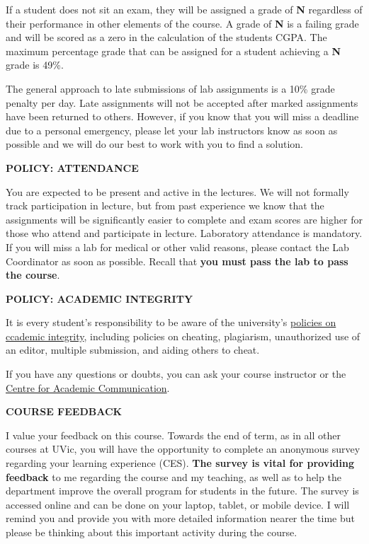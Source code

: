 \documentclass[11pt]{article}
\begin{document}
If a student does not sit an exam, they will be assigned a grade of \textbf{N} regardless of their performance in other elements of the course. A grade of \textbf{N} is a failing grade and will be scored as a zero in the calculation of the students CGPA. The maximum percentage grade that can be assigned for a student achieving a \textbf{N} grade is 49\%. 

The general approach to late submissions of lab assignments is a 10\% grade penalty per day. Late assignments will not be accepted after marked assignments have been returned to others. However, if you know that you will miss a deadline due to a personal emergency, please let your lab instructors know as soon as possible and we will do our best to work with you to find a solution.

\textbf{POLICY: ATTENDANCE}

You are expected to be present and active in the lectures. We will not formally track participation in lecture, but from past experience we know that the assignments will be significantly easier to complete and exam scores are higher for those who attend and participate in lecture. Laboratory attendance is mandatory. If you will miss a lab for medical or other valid reasons, please contact the Lab Coordinator as soon as possible. Recall that \textbf{you must pass the lab to pass the course}.

\textbf{POLICY: ACADEMIC INTEGRITY}

It is every student's responsibility to be aware of the university's \href{https://web.uvic.ca/calendar/undergrad/info/regulations/academic-integrity.html}{policies on ccademic integrity}, including policies on cheating, plagiarism, unauthorized use of an editor, multiple submission, and aiding others to cheat. 

If you have any questions or doubts, you can ask your course instructor or the \href{https://uvic.ca/learningandteaching/cac}{Centre for Academic Communication}.

\begin{center}
  \textbf{COURSE FEEDBACK}
\end{center}

I value your feedback on this course. Towards the end of term, as in all other courses at UVic, you will have the opportunity to complete an anonymous survey regarding your learning experience (CES). \textbf{The survey is vital for providing feedback} to me regarding the course and my teaching, as well as to help the department improve the overall program for students in the future. The survey is accessed online and can be done on your laptop, tablet, or mobile device. I will remind you and provide you with more detailed information nearer the time but please be thinking about this important activity during the course.
\end{document}
